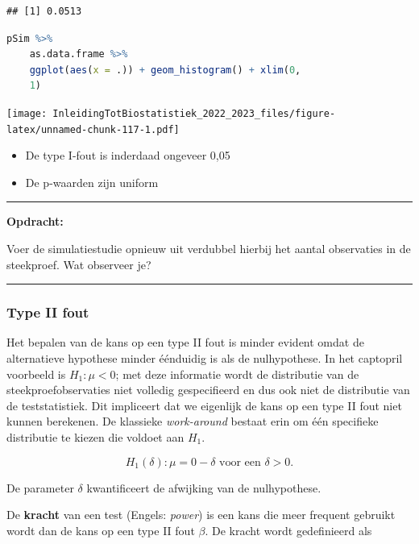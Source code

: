 \documentclass[
  12pt,dutch,coursenotes]{book}
\providecommand{\tightlist}{%
  \setlength{\itemsep}{0pt}\setlength{\parskip}{0pt}}
\begin{document}
\begin{lstlisting}
## [1] 0.0513
\end{lstlisting}

\begin{lstlisting}[language=R]
pSim %>%
    as.data.frame %>%
    ggplot(aes(x = .)) + geom_histogram() + xlim(0,
    1)
\end{lstlisting}

\texttt{[image: InleidingTotBiostatistiek\_2022\_2023\_files/figure-latex/unnamed-chunk-117-1.pdf]}

\begin{itemize}
\tightlist
\item
  De type I-fout is inderdaad ongeveer 0,05
\item
  De p-waarden zijn uniform
\end{itemize}

\begin{center}\rule{0.5\linewidth}{0.5pt}\end{center}

\textbf{Opdracht:}

Voer de simulatiestudie opnieuw uit verdubbel hierbij het aantal observaties in de steekproef. Wat observeer je?

\begin{center}\rule{0.5\linewidth}{0.5pt}\end{center}

\hypertarget{type-ii-fout}{%
\subsubsection{Type II fout}\label{type-ii-fout}}

Het bepalen van de kans op een type II fout is minder evident omdat de alternatieve hypothese minder éénduidig is als de nulhypothese. In het captopril voorbeeld is \(H_1: \mu<0\); met deze informatie wordt de distributie van de steekproefobservaties niet volledig gespecifieerd en dus ook niet de distributie van de teststatistiek. Dit impliceert dat we eigenlijk de kans op een type II fout niet kunnen berekenen. De klassieke \emph{work-around} bestaat erin om één specifieke distributie te kiezen die voldoet aan \(H_1\).

\[H_1(\delta): \mu=0-\delta \text{ voor een }\delta>0.\]

De parameter \(\delta\) kwantificeert de afwijking van de nulhypothese.

De \textbf{kracht} van een test (Engels: \emph{power}) is een kans die meer frequent gebruikt wordt dan de kans op een type II fout \(\beta\). De kracht wordt gedefinieerd als
\end{document}
